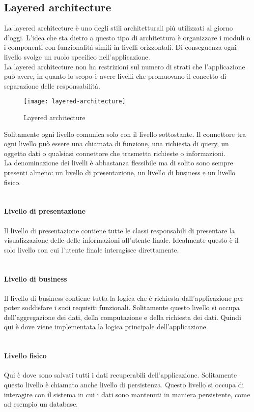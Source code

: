 \subsection{Layered architecture}
La layered architecture è uno degli stili architetturali più utilizzati al giorno d'oggi. L'idea che sta dietro a
questo tipo di architettura è organizzare i moduli o i componenti con funzionalità simili
in livelli orizzontali. Di conseguenza ogni livello svolge un ruolo specifico nell'applicazione.
\\
La layered architecture non ha restrizioni sul numero di strati che l'applicazione può avere, in quanto 
lo scopo è avere livelli che promuovano il concetto di separazione delle responsabilità.
\clearpage
\begin{figure}[H]
    \centering
    \texttt{[image: layered-architecture]}
    \caption{Layered architecture}
\end{figure}
\leavevmode\newline
Solitamente ogni livello comunica solo con il livello sottostante. Il connettore tra ogni livello può 
essere una chiamata di funzione, una richiesta di query, un oggetto dati o qualsiasi connettore che
trasmetta richieste o informazioni.
\\
La denominazione dei livelli è abbastanza flessibile ma di solito sono sempre presenti almeno: un livello di presentazione, un livello
di business e un livello fisico.
\\\\\\
\textbf{Livello di presentazione}
\\\\
Il livello di presentazione contiene tutte le classi responsabili di presentare la visualizzazione delle
delle informazioni all'utente finale. Idealmente questo è il solo livello con cui l'utente finale 
interagisce direttamente.
\\\\\\
\textbf{Livello di business}
\\\\
Il livello di business contiene tutta la logica che è richiesta dall'applicazione per poter soddisfare i 
suoi requisiti funzionali. Solitamente questo livello si occupa dell'aggregazione dei dati, della computazione
e della richiesta dei dati. Quindi qui è dove viene implementata la logica principale dell'applicazione.
\\\\\\
\textbf{Livello fisico}
\\\\
Qui è dove sono salvati tutti i dati recuperabili dell'applicazione. Solitamente questo livello è chiamato
anche livello di persistenza. Questo livello si occupa di interagire con il sistema in cui i dati 
sono mantenuti in maniera persistente, come ad esempio un database.

